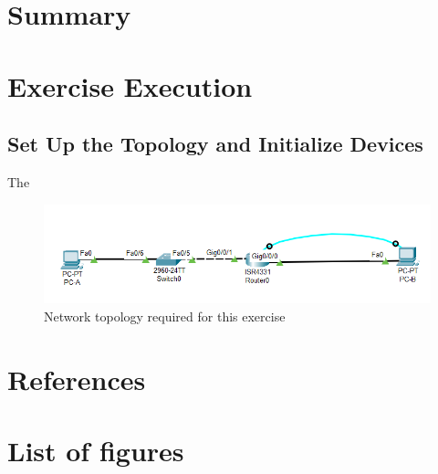 \documentclass[a4paper]{article}
\begin{document}
\section{Summary}


\newpage

\section{Exercise Execution}
\subsection{Set Up the Topology and Initialize Devices}
The 
\begin{figure}[h]
	\includegraphics[scale=0.45]{images/nwtopology.png}
	\caption{Network topology required for this exercise}
	\centering
\end{figure}

\newpage
\section{References}

\newpage
\section{List of figures}

\listoffigures
\end{document}
